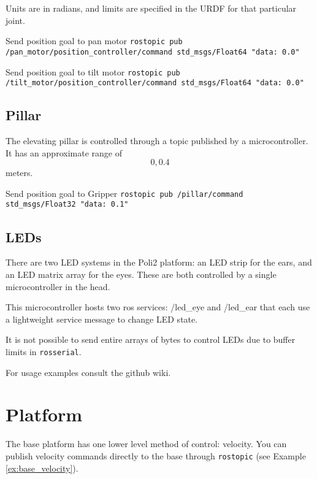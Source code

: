 Units are in radians, and limits are specified in the URDF for that particular joint.

\begin{example}{Send position goal to pan motor}
  \label{ex:pan_pos_goal}
    \texttt{rostopic pub /pan\_motor/position\_controller/command std\_msgs/Float64 "data: 0.0"} \\
\end{example}

\begin{example}{Send position goal to tilt motor}
  \label{ex:tilt_pos_goal}
    \texttt{rostopic pub /tilt\_motor/position\_controller/command std\_msgs/Float64 "data: 0.0"} \\
\end{example}

\subsection{Pillar}
The elevating pillar is controlled through a topic published by a microcontroller. It has an approximate range of \[0,0.4\] meters.

\begin{example}{Send position goal to Gripper}
  \label{ex:pillar_pos_goal}
    \texttt{rostopic pub /pillar/command std\_msgs/Float32 "data: 0.1"} \\
\end{example}

\subsection{LEDs}
There are two LED systems in the Poli2 platform: an LED strip for the ears, and an LED matrix array for the eyes. 
These are both controlled by a single microcontroller in the head. 

This microcontroller hosts two ros services: /led\_eye and /led\_ear that each use a lightweight service message to change LED state. 

It is not possible to send entire arrays of bytes to control LEDs due to buffer limits in \texttt{rosserial}. 

For usage examples consult the github wiki.

\section{Platform}
The base platform has one lower level method of control: velocity. 
You can publish velocity commands directly to the base through \texttt{rostopic} (see Example \ref{ex:base_velocity}). \\


